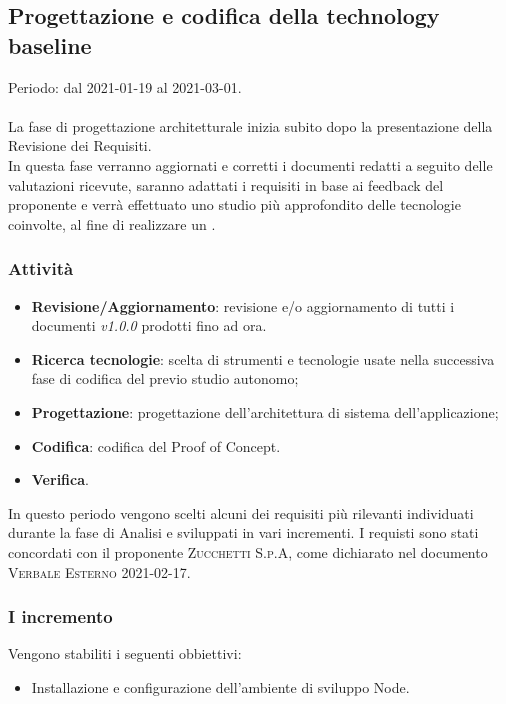 \documentclass[../piano_di_progetto.tex]{subfiles}
\begin{document}
\subsection{Progettazione e codifica della technology baseline}
\label{sub:tech_baseline}
Periodo: dal 2021-01-19 al 2021-03-01. \\ \\
La fase di progettazione architetturale inizia subito dopo la presentazione della Revisione dei Requisiti.\\
In questa fase verranno aggiornati e corretti i documenti redatti a seguito delle valutazioni ricevute, saranno adattati i requisiti in base ai feedback del proponente e verrà effettuato uno studio più approfondito delle tecnologie coinvolte, al fine di realizzare un .

\subsubsection{Attività}
\begin{itemize}
    \item \textbf{Revisione/Aggiornamento}: revisione e/o aggiornamento di tutti i documenti \emph{v1.0.0} prodotti fino ad ora.
    \item \textbf{Ricerca tecnologie}: scelta di strumenti e tecnologie usate nella successiva fase di codifica del  previo studio autonomo;
    \item \textbf{Progettazione}: progettazione dell'architettura di sistema dell'applicazione;
    \item \textbf{Codifica}: codifica del Proof of Concept. 
    \item \textbf{Verifica}.\\
\end{itemize}
In questo periodo vengono scelti alcuni dei requisiti più rilevanti individuati durante la fase di Analisi e sviluppati in vari incrementi.
I requisti sono stati concordati con il proponente \textsc{Zucchetti S.p.A}, come dichiarato nel documento \textsc{Verbale Esterno 2021-02-17}.%

\subsubsection{I incremento}
Vengono stabiliti i seguenti obbiettivi:
\begin{itemize}
    \item Installazione e configurazione dell'ambiente di sviluppo Node.
\end{itemize}
\end{document}
